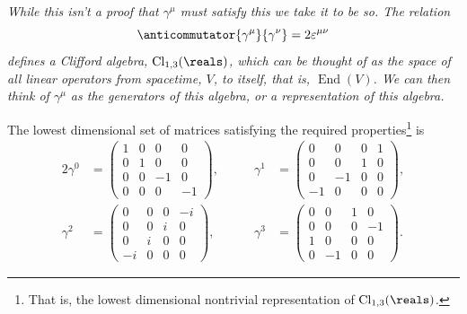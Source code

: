 \documentclass[fleqn]{NotesClass}
\begin{document}
    \itshape
    While this isn't a proof that \(\gamma^\mu\) must satisfy this we take it to be so.
    The relation
    \begin{equation}
        \anticommutator{\gamma^\mu}{\gamma^\nu} = 2\varepsilon^{\mu\nu}
    \end{equation}
    defines a Clifford algebra, \(\operatorname{Cl}_{1,3}(\reals)\), which can be thought of as the space of all linear operators from spacetime, \(V\), to itself, that is, \(\operatorname{End}(V)\).
    We can then think of \(\gamma^\mu\) as the generators of this algebra, or a representation of this algebra.
    \normalshape
    
    The lowest dimensional set of matrices satisfying the required properties\footnote{That is, the lowest dimensional nontrivial representation of \(\operatorname{Cl}_{1,3}(\reals)\).} is
    \begin{alignat}{2}
        \gamma^0 &= 
        \begin{pmatrix}
            1 & 0 & 0 & 0 \\
            0 & 1 & 0 & 0 \\
            0 & 0 & -1 & 0 \\
            0 & 0 & 0 & -1
        \end{pmatrix}
        , \qquad & \gamma^1 &= 
        \begin{pmatrix}
            0 & 0 & 0 & 1 \\
            0 & 0 & 1 & 0 \\
            0 & -1 & 0 & 0\\
            -1 & 0 & 0 & 0
        \end{pmatrix}
        ,\\
        \gamma^2 &= 
        \begin{pmatrix}
            0 & 0 & 0 & -i \\
            0 & 0 & i & 0 \\
            0 & i & 0 & 0 \\
            -i & 0 & 0 & 0
        \end{pmatrix}
        , \qquad & \gamma^3 &= 
        \begin{pmatrix}
            0 & 0 & 1 & 0 \\
            0 & 0 & 0 & -1 \\
            1 & 0 & 0 & 0\\
            0 & -1 & 0 & 0
        \end{pmatrix}
        .
    \end{alignat}
\end{document}
